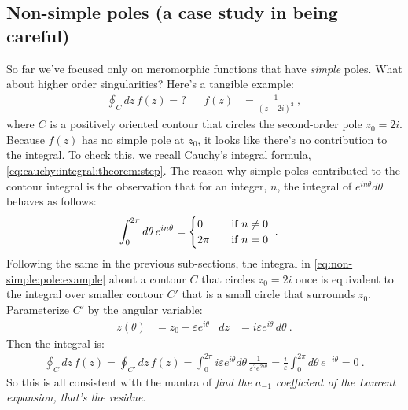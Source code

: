 \subsection{Non-simple poles (a case study in being careful)}

So far we've focused only on meromorphic functions that have \emph{simple} poles. What about higher order singularities? Here's a tangible example:
\begin{align}
	\oint_C dz \, f(z) = ?
	&&
	f(z) &= \frac{1}{(z-2i)^2} \ ,
	\label{eq:non-simple:pole:example}
\end{align}
where $C$ is a positively oriented contour that circles the second-order pole $z_0 = 2i$. Because $f(z)$ has no simple pole at $z_0$, it looks like there's no contribution to the integral. To check this, we recall Cauchy's integral formula, \eqref{eq:cauchy:integral:theorem:step}. The reason why simple poles contributed to the contour integral is the observation that for an integer,  $n$, the integral of $e^{in\theta}d\theta$ behaves as follows: 
\begin{align}
	\int_0^{2\pi}d\theta\, e^{in\theta} 
	&=
	\begin{cases}
	0 & \text{\quad if } n\neq 0
	\\
	2\pi  & \text{\quad if } n= 0
	\end{cases} \ .
\end{align}
Following the same in the previous sub-sections, the integral in \eqref{eq:non-simple:pole:example} about a contour $C$ that circles $z_0=2i$ once is equivalent to the integral over smaller contour $C'$ that is a small circle that surrounds $z_0$. Parameterize $C'$ by the angular variable:
\begin{align}
	z(\theta) &= z_0 + \varepsilon e^{i\theta} & dz &= i\varepsilon e^{i\theta} \, d\theta \ .
\end{align}
Then the integral is:
\begin{align}
	\oint_C dz\, f(z) 
	= 
	\oint_{C'} dz\, f(z) 
	= 
	\int_0^{2\pi} i\varepsilon e^{i\theta} d\theta\, 
	\frac{1}{\varepsilon^2 e^{2i\theta}} 
	=
	\frac{i}{\varepsilon}
	\int_0^{2\pi} d\theta\, 
	e^{-i\theta}
	= 0 \ .
	\label{eq:non-simple:pole:eg:zero}
\end{align}
So this is all consistent with the mantra of \emph{find the $a_{-1}$ coefficient of the Laurent expansion, that's the residue}. 

